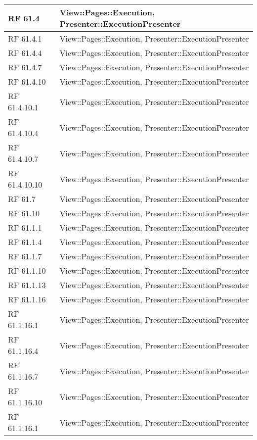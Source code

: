 {\begin{longtable} [c]{| p{3cm} | p{10cm} |}
 \hline 
RF 61.4 & View::Pages::Execution, Presenter::ExecutionPresenter\\ 
 \hline 
RF 61.4.1 & View::Pages::Execution, Presenter::ExecutionPresenter\\ 
 \hline 
RF 61.4.4 & View::Pages::Execution, Presenter::ExecutionPresenter\\ 
 \hline 
RF 61.4.7 & View::Pages::Execution, Presenter::ExecutionPresenter\\ 
 \hline 
RF 61.4.10 & View::Pages::Execution, Presenter::ExecutionPresenter\\ 
 \hline 
RF 61.4.10.1 & View::Pages::Execution, Presenter::ExecutionPresenter\\ 
 \hline 
RF 61.4.10.4 & View::Pages::Execution, Presenter::ExecutionPresenter\\ 
 \hline 
RF 61.4.10.7 & View::Pages::Execution, Presenter::ExecutionPresenter\\ 
 \hline 
RF 61.4.10.10 & View::Pages::Execution, Presenter::ExecutionPresenter\\ 
 \hline 
RF 61.7 & View::Pages::Execution, Presenter::ExecutionPresenter\\ 
 \hline 
RF 61.10 & View::Pages::Execution, Presenter::ExecutionPresenter\\ 
 \hline 
RF 61.1.1 & View::Pages::Execution, Presenter::ExecutionPresenter\\ 
 \hline 
RF 61.1.4 & View::Pages::Execution, Presenter::ExecutionPresenter\\ 
 \hline 
RF 61.1.7 & View::Pages::Execution, Presenter::ExecutionPresenter\\ 
 \hline 
RF 61.1.10 & View::Pages::Execution, Presenter::ExecutionPresenter\\ 
 \hline 
RF 61.1.13 & View::Pages::Execution, Presenter::ExecutionPresenter\\ 
 \hline 
RF 61.1.16 & View::Pages::Execution, Presenter::ExecutionPresenter\\ 
 \hline 
RF 61.1.16.1 & View::Pages::Execution, Presenter::ExecutionPresenter\\ 
 \hline 
RF 61.1.16.4 & View::Pages::Execution, Presenter::ExecutionPresenter\\ 
 \hline 
RF 61.1.16.7 & View::Pages::Execution, Presenter::ExecutionPresenter\\ 
 \hline 
RF 61.1.16.10 & View::Pages::Execution, Presenter::ExecutionPresenter\\ 
 \hline 
RF 61.1.16.1 & View::Pages::Execution, Presenter::ExecutionPresenter\\ 

\end{longtable}}
